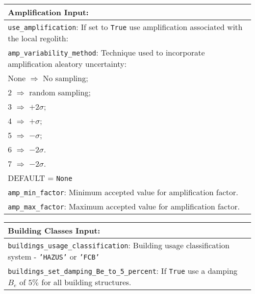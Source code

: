 \documentclass[a4paper, 12pt]{report}
\begin{document}
\vspace{2em}
\begin{tabular}{|p{\textwidth}|}
\hline
\vspace{0.3em} \noindent \Large \textbf{Amplification Input:} \normalsize \\
\hline
\vspace{0.1em} \texttt{use\_amplification}:
If set to \texttt{True} use amplification associated with the local regolith: \\
\hline
\vspace{0.1em} \texttt{amp\_variability\_method}:
Technique used to incorporate amplification aleatory uncertainty: \\
 \hspace{0.5em} None $\Rightarrow$ No sampling; \\
 \hspace{0.5em} 2 $\Rightarrow$ random sampling; \\
 \hspace{0.5em} 3 $\Rightarrow$ $+2\sigma$; \\
 \hspace{0.5em} 4 $\Rightarrow$ $+\sigma$; \\
 \hspace{0.5em} 5 $\Rightarrow$ $-\sigma$; \\
 \hspace{0.5em} 6 $\Rightarrow$ $-2\sigma$.\\
 \hspace{0.5em} 7 $\Rightarrow$ $-2\sigma$.\\
 \hspace{5em} DEFAULT = \texttt{None} \\
\hline
\vspace{0.1em} \texttt{amp\_min\_factor}:
Minimum accepted value for amplification factor.    \\
\hline
\vspace{0.1em} \texttt{amp\_max\_factor}:
Maximum accepted value for amplification factor.   \\
\hline
\end{tabular}

\vspace{2em}
\begin{tabular}{|p{\textwidth}|}
\hline
\vspace{0.3em} \noindent \Large \textbf{Building Classes Input:} \normalsize \\
\hline
\vspace{0.1em} \texttt{buildings\_usage\_classification}:
Building usage classification system - \texttt{'HAZUS'} or \texttt{'FCB'} \\
\hline
\vspace{0.1em} \texttt{buildings\_set\_damping\_Be\_to\_5\_percent}:
If \texttt{True} use a damping $B_e$ of $5\%$ for all building structures.\\
\hline
 \end{tabular}
\end{document}
